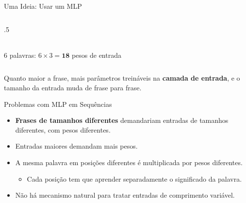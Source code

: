 \documentclass[aspectratio=169,xcolor=dvipsnames]{beamer}
\begin{document}
\begin{frame}{Uma Ideia: Usar um MLP}
\begin{columns}[T]
\begin{column}{.5\linewidth}
\\[0.4em]
        {\footnotesize 6 palavras: $6\times 3 = \mathbf{18}$ pesos de entrada}
    \end{column}
\end{columns}
\vspace{0.3em}
\begin{center}
    \colorbox{PastelOrange}{\parbox{0.92\linewidth}{\centering\small Quanto maior a frase, mais parâmetros treináveis na \textbf{camada de entrada}, e o tamanho da entrada muda de frase para frase.}}
\end{center}
\end{frame}

\begin{frame}{Problemas com MLP em Sequências}
\begin{itemize}
    \item \textbf{Frases de tamanhos diferentes} demandariam entradas de tamanhos diferentes, com pesos diferentes.
    \item Entradas maiores demandam mais pesos.
    \item A mesma palavra em posições diferentes é multiplicada por pesos diferentes.
    \begin{itemize}
        \item Cada posição tem que aprender separadamente o significado da palavra.
    \end{itemize}
    \item Não há mecanismo natural para tratar entradas de comprimento variável.
\end{itemize}
\end{frame}
\end{document}
